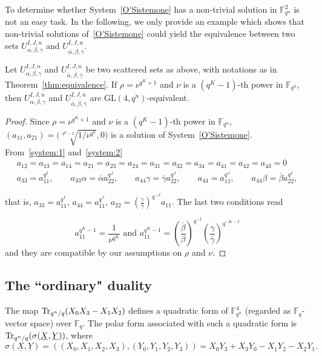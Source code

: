 To determine whether System~\eqref{O'Sistemone} has a non-trivial solution in $\mathbb{F}_{q^n}^2$ is not an easy task. In the following, we only provide an example which shows that non-trivial solutions of~\eqref{O'Sistemone} could  yield the equivalence between  two sets $U_{\alpha, \beta, \gamma}^{I,J,n}$ and $U_{\overline{\alpha}, \overline{\beta}, \overline{\gamma}}^{I,J,n}$.

\begin{coro}
\label{cor:equivalence:3}
Let $U_{\alpha, \beta, \gamma}^{I,J,n}$ and $U_{\overline{\alpha}, \overline{\beta}, \overline{\gamma}}^{I,J,n}$ be two scattered sets as above, with notations as in Theorem~\ref{thm:equivalence}. 
If $\rho = \nu^{q^K+1}$ and $\nu$ is a $\left(q^K-1\right)$-th power in $\mathbb{F}_{q^n}$, then $U_{\alpha, \beta, \gamma}^{I,J,n}$ and $U_{\overline{\alpha}, \overline{\beta}, \overline{\gamma}}^{I,J,n}$ are $\textrm{GL}(4,q^n)$-equivalent.
\end{coro}

\begin{proof}
Since $\rho = \nu^{q^K+1}$ and $\nu$ is a $\left(q^K-1\right)$-th power in $\mathbb{F}_{q^n}$, $(a_{11},a_{21})=\Big(\sqrt[q^{K}-1]{1/\nu^{q^k}},0\Big)$ is a solution of  System~\eqref{O'Sistemone}. 
From~\eqref{system:1} and~\eqref{system:2} 
\begin{eqnarray*}a_{12}=a_{13}=a_{14}=a_{21}=a_{23}=a_{24}=a_{31} = a_{32} = a_{34} = a_{41}=a_{42}=a_{43}=0\\
        a_{33} = a_{11}^{q^I}, \qquad 
        a_{33}\alpha = \overline{\alpha}a_{22}^{q^J}, \qquad 
             a_{44}\gamma = \overline{\gamma}a_{22}^{q^J}, \qquad 
        a_{44} = a_{11}^{q^J}, \qquad 
        a_{44}\beta = \overline{\beta}a_{22}^{q^I},
\end{eqnarray*}

that is, $a_{33} = a_{11}^{q^I}$, $a_{44} = a_{11}^{q^J}$, $a_{22}=\left(\frac{\gamma}{\overline{\gamma}}\right)^{q^{-J}}a_{11}$. The last two conditions read 

$$a_{11}^{q^K-1}=\frac{1}{\nu^{q^K}} \textrm{ and } a_{11}^{q^K-1}=\left(\frac{\overline{\beta}}{\beta}\right)^{q^{-I}}\left(\frac{\gamma}{\overline{\gamma}}\right)^{q^{-K-I}}$$
and they are compatible by our assumptions on $\rho$ and $\nu$.
\end{proof} 
 
\subsection{The ``ordinary" duality}
The map ${\rm Tr}_{{q^n}/q}(X_0X_3-X_1X_2)$ defines a quadratic form of
${\mathbb F}_{q^n}^4$ (regarded as $\mathbb{F}_q$-vector space) over $\mathbb{F}_q$. The polar form
associated with such a quadratic form is
${\rm Tr}_{{q^n}/q}(\sigma(\underline{X},\underline{Y}))$, where $$\sigma (\underline{X},\underline{Y})=\left((X_0,X_1,X_2,X_3),(Y_0,Y_1,Y_2,Y_3)\right)=X_0Y_3+X_3Y_0-X_1Y_2-X_2Y_1.$$ 

